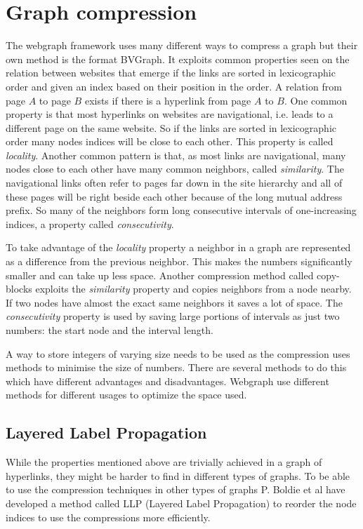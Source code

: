 \section{Graph compression}
\label{sec:Compression}

The webgraph framework\cite{webgraph} uses many different ways to compress a graph but their own method is the format BVGraph. It exploits common properties seen on the relation between websites that emerge if the links are sorted in lexicographic order and given an index based on their position in the order. A relation from page $A$ to page $B$ exists if there is a hyperlink from page $A$ to $B$. One common property is that most hyperlinks on websites are navigational, i.e. leads to a different page on the same website. So if the links are sorted in lexicographic order many nodes indices will be close to each other. This property is called \emph{locality}. Another common pattern is that, as most links are navigational, many nodes close to each other have many common neighbors, called \emph{similarity}. The navigational links often refer to pages far down in the site hierarchy and all of these pages will be right beside each other because of the long mutual address prefix. So many of the neighbors form long consecutive intervals of one-increasing indices, a property called \emph{consecutivity}. \cite{webgraph-compression}

To take advantage of the \emph{locality} property a neighbor in a graph are represented as a difference from the previous neighbor. This makes the numbers significantly smaller and can take up less space. Another compression method called copy-blocks exploits the \emph{similarity} property and copies neighbors from a node nearby. If two nodes have almost the exact same neighbors it saves a lot of space. The \emph{consecutivity} property is used by saving large portions of intervals as just two numbers: the start node and the interval length. \cite{webgraph-compression}

A way to store integers of varying size needs to be used as the compression uses methods to minimise the size of numbers. There are several methods to do this which have different advantages and disadvantages. Webgraph use different methods for different usages to optimize the space used. \cite{webgraph-compression}

\subsection{Layered Label Propagation}

While the properties mentioned above are trivially achieved in a graph of hyperlinks, they might be harder to find in different types of graphs. To be able to use the compression techniques in other types of graphs P. Boldie et al have developed a method called LLP (Layered Label Propagation) to reorder the node indices to use the compressions more efficiently. \cite{llp} 

